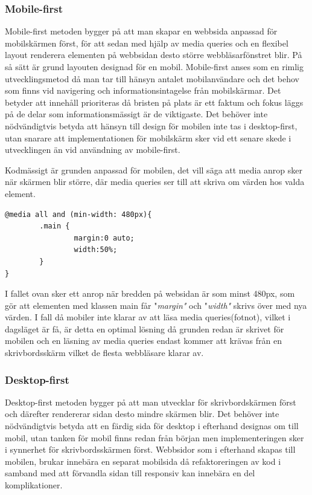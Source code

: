 \documentclass[11pt]{article}
\begin{document}
\subsubsection{Mobile-first}
Mobile-first metoden bygger på att man skapar en webbsida anpassad för mobilskärmen först, för att sedan med hjälp av media queries och en flexibel layout renderera elementen på webbsidan desto större webbläsarfönstret blir.  På så sätt är grund layouten designad för en mobil. Mobile-first anses som en rimlig utvecklingsmetod då man tar till hänsyn antalet mobilanvändare och det behov som finns vid navigering och informationsintagelse från mobilskärmar.  Det betyder att innehåll prioriteras då bristen på plats är ett faktum och fokus läggs på de delar som informationsmässigt är de viktigaste. Det behöver inte nödvändigtvis betyda att hänsyn till design för mobilen inte tas i desktop-first, utan snarare att implementationen för mobilskärm sker vid ett senare skede i utvecklingen än vid användning av mobile-first.

Kodmässigt är grunden anpassad för mobilen, det vill säga att media anrop sker när skärmen blir större, där media queries ser till att skriva om värden hos valda element. 
\vspace{0.5cm}
 \begin{verbatim}
@media all and (min-width: 480px){
        .main {
                margin:0 auto;
                width:50%;
        }
}
\end{verbatim}

\vspace{0.5cm}
I fallet ovan sker ett anrop när bredden på websidan är som minst 480px, som gör att elementen med klassen main får "\textit{margin"} och "\textit{width"} skrivs över med nya värden. I fall då mobiler inte klarar av att läsa media queries(fotnot), vilket i dagsläget är få, är detta en optimal lösning då grunden redan är skrivet för mobilen och en läsning av media queries endast kommer att krävas från en skrivbordsskärm vilket de flesta webbläsare klarar av.

\subsubsection{Desktop-first}
Desktop-first metoden bygger på att man utvecklar för skrivbordskärmen först och därefter rendererar sidan desto mindre skärmen blir. Det behöver inte nödvändigtvis betyda att en färdig sida för desktop i efterhand designas om till mobil, utan tanken för mobil finns redan från början men implementeringen sker i synnerhet för skrivbordsskärmen först. Webbsidor som i efterhand skapas till mobilen, brukar innebära en separat mobilsida då refaktoreringen av kod i samband med att förvandla sidan till responsiv kan innebära en del komplikationer.  
\end{document}
